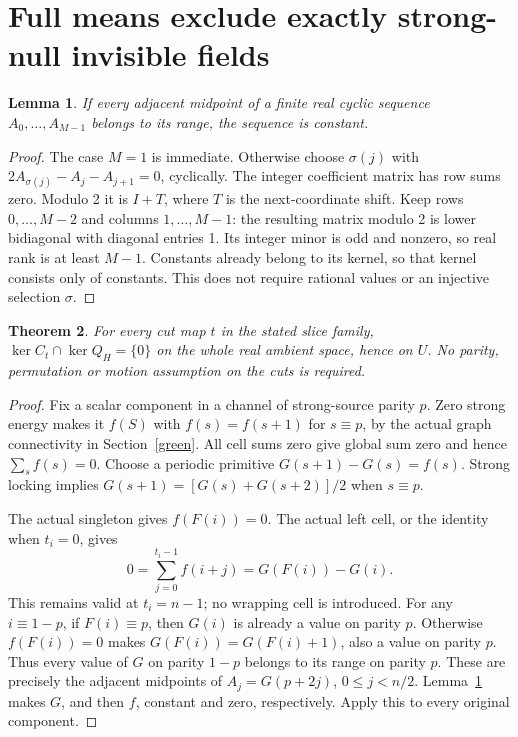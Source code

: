 \documentclass[11pt,a4paper]{article}
\newtheorem{theorem}{Theorem}[section]
\newtheorem{lemma}[theorem]{Lemma}
\begin{document}
\section{Full means exclude exactly strong-null invisible fields}
\begin{lemma}\label{midpoint}
If every adjacent midpoint of a finite real cyclic sequence
$A_0,\ldots,A_{M-1}$ belongs to its range, the sequence is constant.
\end{lemma}
\begin{proof}
The case $M=1$ is immediate. Otherwise choose $\sigma(j)$ with
$2A_{\sigma(j)}-A_j-A_{j+1}=0$, cyclically. The integer coefficient matrix
has row sums zero. Modulo 2 it is $I+T$, where $T$ is the next-coordinate
shift. Keep rows $0,\ldots,M-2$ and columns $1,\ldots,M-1$: the resulting
matrix modulo 2 is lower bidiagonal with diagonal entries 1. Its integer
minor is odd and nonzero, so real rank is at least $M-1$. Constants already
belong to its kernel, so that kernel consists only of constants. This does
not require rational values or an injective selection $\sigma$.
\end{proof}

\begin{theorem}\label{exactzero}
For every cut map $t$ in the stated slice family,
$\ker C_t\cap\ker Q_H=\{0\}$ on the whole real ambient space, hence on $U$.
No parity, permutation or motion assumption on the cuts is required.
\end{theorem}
\begin{proof}
Fix a scalar component in a channel of strong-source parity $p$.
Zero strong energy makes it $f(S)$ with $f(s)=f(s+1)$ for $s\equiv p$,
by the actual graph connectivity in Section~\ref{green}. All cell sums zero
give global sum zero and hence $\sum_s f(s)=0$. Choose a periodic primitive
$G(s+1)-G(s)=f(s)$. Strong locking implies
$G(s+1)=[G(s)+G(s+2)]/2$ when $s\equiv p$.

The actual singleton gives $f(F(i))=0$. The actual left cell, or the
identity when $t_i=0$, gives
\[
 0=\sum_{j=0}^{t_i-1}f(i+j)=G(F(i))-G(i).
\]
This remains valid at $t_i=n-1$; no wrapping cell is introduced. For any
$i\equiv1-p$, if $F(i)\equiv p$, then $G(i)$ is already a value on parity
$p$. Otherwise $f(F(i))=0$ makes $G(F(i))=G(F(i)+1)$, also a value on
parity $p$. Thus every value of $G$ on parity $1-p$ belongs to its range
on parity $p$. These are precisely the adjacent midpoints of
$A_j=G(p+2j)$, $0\leq j<n/2$. Lemma~\ref{midpoint} makes $G$, and then
$f$, constant and zero, respectively. Apply this to every original component.
\end{proof}
\end{document}

